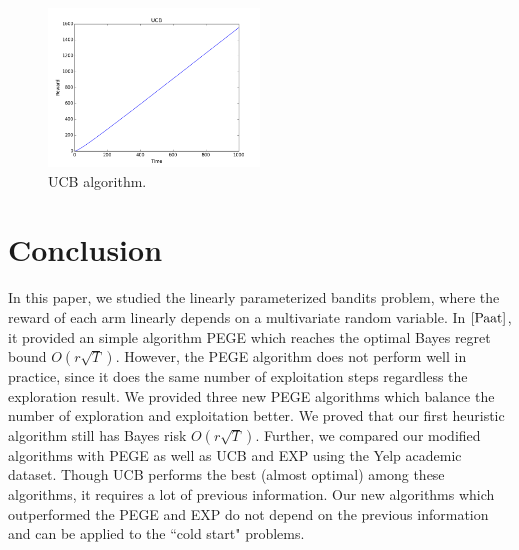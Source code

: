 \documentclass{article}
\theoremstyle{plain}
\theoremstyle{definition}
\begin{document}
\begin{figure}[htb]
{
\centering
\includegraphics[width=0.50\textwidth]{UCB1}
\caption{UCB algorithm. \label{fig: tah2}}
}
\end{figure}






\section{Conclusion}

In this paper, we studied the linearly parameterized bandits problem, where the reward of each arm linearly depends on a multivariate random variable. In $\cite{Paat}$, it provided an simple algorithm PEGE which reaches the optimal Bayes regret bound $O(r\sqrt{T})$. However, the PEGE algorithm does not perform well in practice, since it does the same number of exploitation steps regardless the exploration result. We provided three new PEGE algorithms which balance the number of exploration and exploitation better. We proved that our first heuristic algorithm still has Bayes risk $O(r\sqrt{T})$. Further, we compared our modified algorithms with PEGE as well as UCB and EXP using the Yelp academic dataset. Though UCB performs the best (almost optimal) among these algorithms, it requires a lot of previous information. Our new algorithms which outperformed the PEGE and EXP do not depend on the previous information and can be applied to the ``cold start" problems.


\nocite{langley00}





%
%
%
\end{document}
